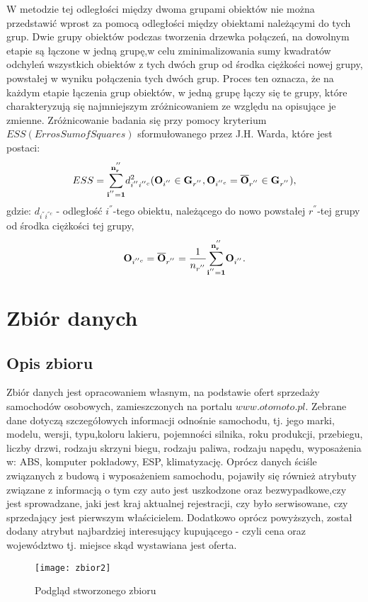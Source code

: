\documentclass[12pt,a4paper]{report}
\begin{document}
W metodzie tej odległości między dwoma grupami obiektów nie można przedstawić wprost za pomocą odległości między obiektami należącymi do tych grup. Dwie grupy obiektów podczas tworzenia drzewka połączeń, na dowolnym etapie są łączone w jedną grupę,w celu zminimalizowania sumy kwadratów odchyleń wszystkich obiektów z tych dwóch grup od środka ciężkości nowej grupy, powstałej w wyniku połączenia tych dwóch grup. Proces ten oznacza, że na każdym etapie łączenia grup obiektów, w jedną grupę łączy się te grupy, które charakteryzują się najmniejszym zróżnicowaniem ze względu na opisujące je zmienne. Zróżnicowanie badania się przy pomocy kryterium $ESS (Erros Sum of Squares)$ sformułowanego przez J.H. Warda, które jest postaci:
\begin{equation}
ESS= \bold{\sum_{i^{''}=1}^{n_r^{''}}} d_{i^{''}i^{''c}}^2 ( \bold{O}_{i^{''}} \in \bold{G}_{r^{''}}, \bold{O}_{i^{''c}}=\bold{\overline{O}}_{r^{''}} \in \bold{G}_{r^{''}} ),
\end{equation} 
gdzie:
$d_{i^{''}i^{''c}}$ - odległość $i^{''}$-tego obiektu, należącego do nowo powstałej $r^{''}$-tej grupy od środka ciężkości tej grupy,\\
\begin{equation}
\bold{O}_{i^{''c}} = \bold{\overline{O}}_{r^{''}}=\frac{1}{n_{r^{''}}} \bold{\sum_{i^{''}=1}^{n_r^{''}}} \bold{O}_{i^{''}}.
\end{equation}

\newpage
\chapter{Zbiór danych}

\section{Opis zbioru}
\noindent

Zbiór danych jest opracowaniem własnym, na podstawie ofert sprzedaży samochodów osobowych, zamieszczonych na portalu $www.otomoto.pl$. Zebrane dane dotyczą szczegółowych informacji odnośnie samochodu, tj. jego marki, modelu, wersji, typu,koloru lakieru, pojemności silnika, roku produkcji, przebiegu, liczby drzwi, rodzaju skrzyni biegu, rodzaju paliwa, rodzaju napędu, wyposażenia w: ABS, komputer pokładowy, ESP, klimatyzację. Oprócz danych ściśle związanych z budową i wyposażeniem samochodu, pojawiły się również atrybuty związane z informacją o tym czy auto jest uszkodzone oraz bezwypadkowe,czy jest sprowadzane, jaki jest kraj aktualnej rejestracji, czy było serwisowane, czy sprzedający jest pierwszym właścicielem. Dodatkowo oprócz powyższych, został dodany atrybut najbardziej interesujący kupującego - czyli cena oraz województwo tj. miejsce skąd wystawiana jest oferta.
\begin{figure}[h]
\centering
\texttt{[image: zbior2]}
\caption{Podgląd stworzonego zbioru}
\label{fig:obrazek1}
\end{figure}
\end{document}
